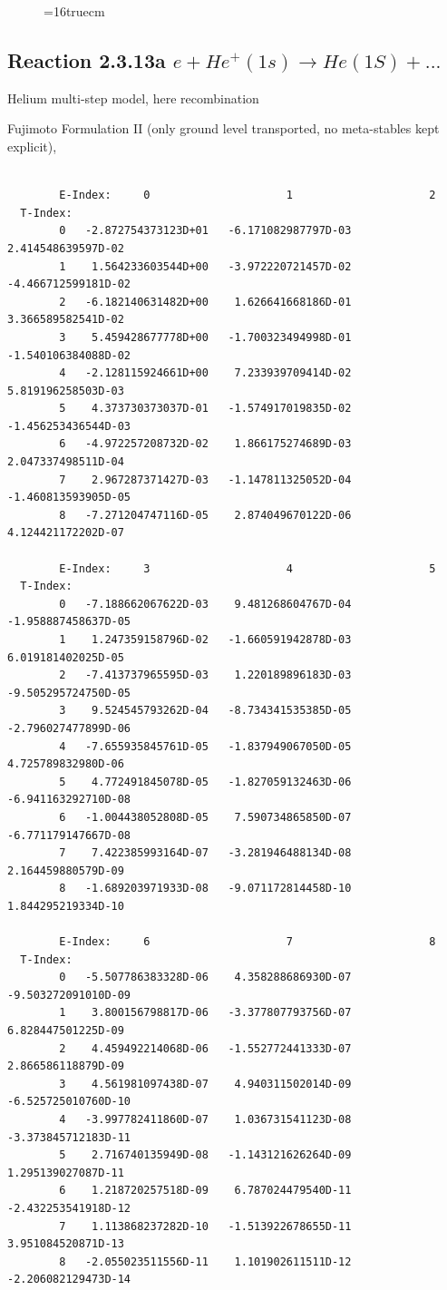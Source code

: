 \documentclass[12pt,dvips]{article}
\begin{document}
\begin{figure} \label{2.3.9j}
\epsfxsize=16truecm
\end{figure}
\newpage


\subsection{
Reaction 2.3.13a  $e + He^+(1s) \rightarrow He(1S) + ...  $
}

Helium multi-step model, here recombination

 Fujimoto Formulation II (only ground level transported, no meta-stables kept
explicit), \cite{kn:Fujimoto}


\begin{small}\begin{verbatim}

        E-Index:     0                     1                     2
  T-Index:
        0   -2.872754373123D+01   -6.171082987797D-03    2.414548639597D-02
        1    1.564233603544D+00   -3.972220721457D-02   -4.466712599181D-02
        2   -6.182140631482D+00    1.626641668186D-01    3.366589582541D-02
        3    5.459428677778D+00   -1.700323494998D-01   -1.540106384088D-02
        4   -2.128115924661D+00    7.233939709414D-02    5.819196258503D-03
        5    4.373730373037D-01   -1.574917019835D-02   -1.456253436544D-03
        6   -4.972257208732D-02    1.866175274689D-03    2.047337498511D-04
        7    2.967287371427D-03   -1.147811325052D-04   -1.460813593905D-05
        8   -7.271204747116D-05    2.874049670122D-06    4.124421172202D-07

        E-Index:     3                     4                     5
  T-Index:
        0   -7.188662067622D-03    9.481268604767D-04   -1.958887458637D-05
        1    1.247359158796D-02   -1.660591942878D-03    6.019181402025D-05
        2   -7.413737965595D-03    1.220189896183D-03   -9.505295724750D-05
        3    9.524545793262D-04   -8.734341535385D-05   -2.796027477899D-06
        4   -7.655935845761D-05   -1.837949067050D-05    4.725789832980D-06
        5    4.772491845078D-05   -1.827059132463D-06   -6.941163292710D-08
        6   -1.004438052808D-05    7.590734865850D-07   -6.771179147667D-08
        7    7.422385993164D-07   -3.281946488134D-08    2.164459880579D-09
        8   -1.689203971933D-08   -9.071172814458D-10    1.844295219334D-10

        E-Index:     6                     7                     8
  T-Index:
        0   -5.507786383328D-06    4.358288686930D-07   -9.503272091010D-09
        1    3.800156798817D-06   -3.377807793756D-07    6.828447501225D-09
        2    4.459492214068D-06   -1.552772441333D-07    2.866586118879D-09
        3    4.561981097438D-07    4.940311502014D-09   -6.525725010760D-10
        4   -3.997782411860D-07    1.036731541123D-08   -3.373845712183D-11
        5    2.716740135949D-08   -1.143121626264D-09    1.295139027087D-11
        6    1.218720257518D-09    6.787024479540D-11   -2.432253541918D-12
        7    1.113868237282D-10   -1.513922678655D-11    3.951084520871D-13
        8   -2.055023511556D-11    1.101902611511D-12   -2.206082129473D-14


\end{verbatim}
\end{small}
\end{document}
